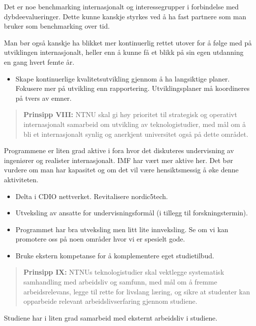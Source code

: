 Det er noe benchmarking internasjonalt og interessegrupper i forbindelse med dybdeevalueringer. Dette kunne kanskje styrkes ved å ha fast partnere som man bruker som benchmarking over tid. 

Man bør også kanskje ha blikket mer kontinuerlig rettet utover for å følge med på utviklingen internasjonalt, heller enn å kunne få et blikk på sin egen utdanning en gang hvert femte år.

\begin{itemize}
	\item Skape kontinuerlige kvalitetsutvikling gjennom å ha langsiktige planer. Fokusere mer på utvikling enn rapportering. Utviklingsplaner må koordineres på tvers av emner.
\end{itemize}


\begin{quote}
	\textbf{Prinsipp VIII:} NTNU skal gi høy prioritet til strategisk og operativt internasjonalt samarbeid om utvikling av teknologistudier, med mål om å bli et internasjonalt synlig og anerkjent universitet også på dette området.
\end{quote}

Programmene er liten grad aktive i fora hvor det diskuteres undervisning av ingeniører og realister internasjonalt. IMF har vært mer aktive her. Det bør vurdere om man har kapasitet og om det vil være hensiktsmessig å øke denne aktiviteten.

\begin{itemize}
	\item Delta i CDIO nettverket. Revitalisere nordic5tech.
	\item Utveksling av ansatte for undervisningsformål (i tillegg til forskningstermin).
	\item Programmet har bra utveksling men litt lite innveksling. Se om vi kan promotere oss på noen områder hvor vi er spesielt gode.
	\item Bruke ekstern kompetanse for å komplementere eget studietilbud.
\end{itemize}

\begin{quote}
	\textbf{Prinsipp IX:} NTNUs teknologistudier skal vektlegge systematisk samhandling med arbeidsliv og samfunn, med mål om å fremme arbeidsrelevans, legge til rette for livslang læring, og sikre at studenter kan opparbeide relevant arbeidslivserfaring gjennom studiene.
\end{quote}

Studiene har i liten grad samarbeid med eksternt arbeidsliv i studiene.

